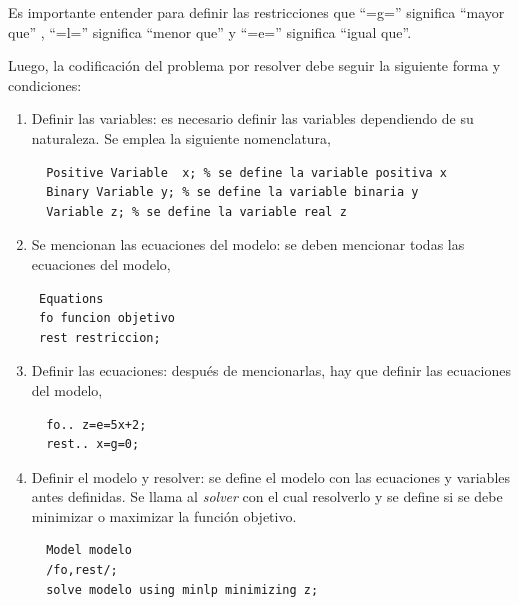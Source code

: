 Es importante entender para definir las restricciones que “=g=” significa “mayor que” , “=l=” significa “menor que” y “=e=” significa “igual que”.
\vspace{2.5mm}

Luego, la codificación del problema por resolver debe seguir la siguiente forma y condiciones:

\begin{enumerate}
   \item Definir las variables: es necesario definir las variables dependiendo de su naturaleza. Se emplea la siguiente nomenclatura,
   
   \begin{footnotesize}
    \begin{lstlisting}
  Positive Variable  x; % se define la variable positiva x
  Binary Variable y; % se define la variable binaria y
  Variable z; % se define la variable real z
   \end{lstlisting}
   \end{footnotesize}
  
   \item Se mencionan las ecuaciones del modelo: se deben mencionar todas las ecuaciones del modelo, 
   \begin{footnotesize}
   \begin{lstlisting}
 Equations
 fo funcion objetivo
 rest restriccion;
  \end{lstlisting}
   \end{footnotesize}
   
  \item Definir las ecuaciones: después de mencionarlas, hay que definir las ecuaciones del modelo,
  
  \begin{footnotesize}
   \begin{lstlisting}
  fo.. z=e=5x+2;
  rest.. x=g=0;
  \end{lstlisting}
  \end{footnotesize}
 
  
  \item  Definir el modelo y resolver: se define el modelo con las ecuaciones y variables antes definidas. Se llama al \textit{solver} con el cual resolverlo y se define si se debe minimizar o maximizar la función objetivo. 
  
  \begin{footnotesize}
  \begin{lstlisting}
  Model modelo
  /fo,rest/;
  solve modelo using minlp minimizing z;
  \end{lstlisting}
  \end{footnotesize}
  
  \end{enumerate}



